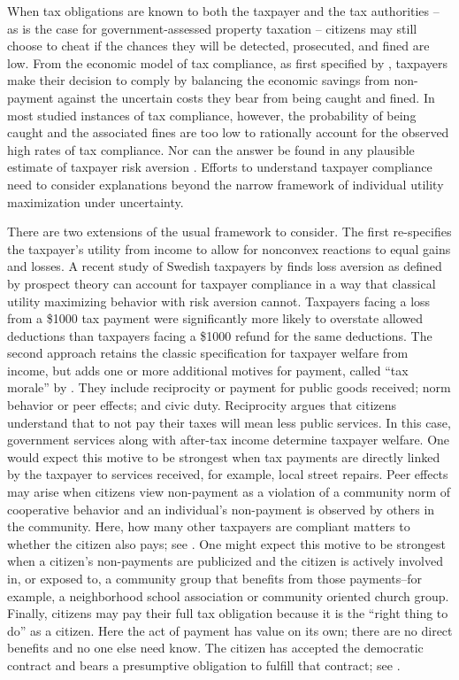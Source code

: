 \documentclass[12pt,titlepage]{article}
\begin{document}
When tax obligations are known to both the taxpayer and the tax
authorities – as is the case for government-assessed property
taxation – citizens may still choose to cheat if the chances they
will be detected, prosecuted, and fined are low.  From the economic
model of tax compliance, as first specified by \citet{allingham},
taxpayers make their decision to comply by balancing the economic
savings from non-payment against the uncertain costs they bear from
being caught and fined.  In most studied instances of tax compliance,
however, the probability of being caught and the associated fines are
too low to rationally account for the observed high rates of tax
compliance.    Nor can the answer be found in any plausible estimate
of taxpayer risk aversion \citep{alm}. Efforts to understand taxpayer 
compliance need to consider explanations beyond the narrow framework of 
individual utility maximization under uncertainty.  

There are two extensions of the usual framework to consider. 
The first re-specifies the taxpayer’s utility from income to allow for
nonconvex reactions to equal gains and losses.  A recent study of 
Swedish taxpayers by \citet{engstrom} finds loss aversion 
as defined by prospect theory can account for taxpayer compliance in 
a way that classical utility maximizing behavior with risk aversion 
cannot.  Taxpayers facing a loss from a \$1000 tax payment were
significantly more likely to overstate allowed deductions than
taxpayers facing a \$1000 refund for the same deductions.  
The second approach retains the classic specification for 
taxpayer welfare from income, but adds one or more additional 
motives for payment, called “tax morale” by \citet{luttmer}.  
They include reciprocity or payment for public goods received; 
norm behavior or peer effects; and civic duty.   Reciprocity argues 
that citizens understand that to not pay their taxes will mean less 
public services.   In this case, government services along with 
after-tax income determine taxpayer welfare.  One would expect this 
motive to be strongest when tax payments are directly linked by the 
taxpayer to services received, for example, local street repairs.   
Peer effects may arise when citizens view non-payment as a violation 
of a community norm of cooperative behavior and an individual’s 
non-payment is observed by others in the community.  Here, how many 
other taxpayers are compliant matters to whether the citizen 
also pays; see \citet{posner}.   One might expect this motive to be 
strongest when a citizen’s non-payments are publicized and the citizen 
is actively involved in, or exposed to,  a community group that benefits 
from those payments--for example, a neighborhood school association or 
community oriented church group.  Finally, citizens may pay their full 
tax obligation because it is the “right thing to do” as a citizen.  
Here the act of payment has value on its own; there are no direct 
benefits and no one else need know.  The citizen has accepted the 
democratic contract and bears a presumptive obligation to fulfill 
that contract; see \citet[350-355]{rawls}.  
\end{document}
